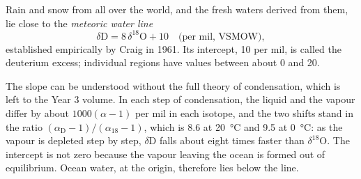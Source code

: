 \begin{proposition}\label{prop:b2:isotope-geochemistry:mwl}
Rain and snow from all over the world, and the fresh waters derived from them,
lie close to the \emph{meteoric water line}
\[
  \delta\mathrm{D} = 8\,\delta^{18}\mathrm{O} + 10 \quad\text{(per mil, VSMOW)},
\]
established empirically by Craig in 1961. Its intercept, 10 per mil, is called
the deuterium excess; individual regions have values between about 0 and 20.
\end{proposition}
\admitted

\noindent The slope can be understood without the full theory of condensation,
which is left to the Year 3 volume. In each step of condensation, the liquid
and the vapour differ by about $1000(\alpha - 1)$ per mil in each isotope, and
the two shifts stand in the ratio $(\alpha_{\mathrm D}-1)/(\alpha_{18}-1)$, which
is 8.6 at \qty{20}{\degreeCelsius} and 9.5 at \qty{0}{\degreeCelsius}: as the
vapour is depleted step by step, $\delta\mathrm{D}$ falls about eight times faster
than $\delta^{18}\mathrm{O}$. The intercept is not zero because the vapour leaving
the ocean is formed out of equilibrium. Ocean water, at the origin, therefore lies
below the line.

